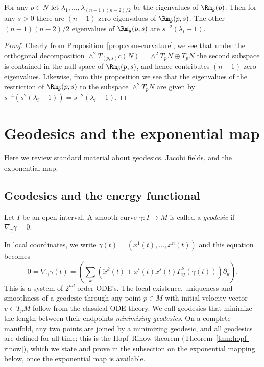 \begin{corollary}
\label{cor:cone-eigenvalues}
For any $p\in N$ let $\lambda_1,\ldots,\lambda_{(n-1)(n-2)/2}$ be
the eigenvalues of $\Rm_g(p)$. Then for any $s>0$  there are
$(n-1)$ zero eigenvalues of $\Rm_{\tilde g}(p,s)$. The other
$(n-1)(n-2)/2$ eigenvalues of $\Rm_{\tilde g}(p,s)$ are
$s^{-2}(\lambda_i-1)$.
\end{corollary}


\begin{proof}
Clearly from Proposition~\ref{prop:cone-curvature}, we see that under the
orthogonal decomposition $\wedge^2T_{(p,s)}c(N)=\wedge^2T_pN\oplus
T_pN$ the second subspace is contained in the null space of $ \Rm_{\tilde g}(p,s)$, and hence contributes $(n-1)$ zero
eigenvalues. Likewise, from this proposition we see that the
eigenvalues of the restriction of $\Rm_{\tilde g}(p,s)$ to the
subspace $\wedge^2T_pN$ are  given by
$s^{-4}(s^2(\lambda_i-1))=s^{-2}(\lambda_i-1)$.
\end{proof}


\section{Geodesics and the exponential map}

Here we review standard material about geodesics, Jacobi fields, and
the exponential map.

\subsection{Geodesics and the energy functional}

\begin{definition}[Geodesic]
\label{def:geodesic}
\leanok
 Let $I$ be an open interval.
A smooth curve $\gamma\colon I \rightarrow M$ is called a
\textit{geodesic} if $\nabla_{\dot \gamma}\dot
\gamma =0$.
\end{definition}

In local coordinates, we write $\gamma(t)=(x^1(t),\ldots,x^n(t))$
and this equation becomes
$$0=\nabla_{\dot \gamma}\dot \gamma(t) =
\left(\sum\limits_k\left(\ddot x^k(t) +\dot x^i(t)\dot
x^j(t)\Gamma^{k}_{ij}(\gamma(t))\right)\partial_k\right).$$ This is
a system of $2^{nd}$ order ODE's. The local existence, uniqueness
and smoothness of a geodesic through any point $p\in M$ with initial
velocity vector $v\in T_pM$ follow from the classical ODE theory.
We call geodesics that minimize the length between their endpoints
{\em minimizing geodesics}. On a complete manifold, any two points
are joined by a minimizing geodesic, and all geodesics are defined
for all time; this is the Hopf--Rinow theorem
(Theorem~\ref{thm:hopf-rinow}), which we state and prove in the
subsection on the exponential mapping below, once the exponential
map is available.


